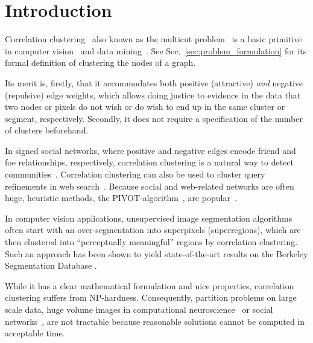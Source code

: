 %
\section{Introduction}
Correlation clustering~\cite{Bansal-2002} also known as the multicut problem~\cite{chopra_1993_mp} 
is a basic primitive in computer vision~\cite{andres_2011_iccv,kroeger_2012_eccv,yarkony_2012_eccv,alush_2013_simbad} and data mining~\cite{Chierichetti-2014,Arasu-2009,Sadikov-2010,Chen-2012}.
See Sec.~\ref{sec:problem_formulation} for its formal definition of clustering the nodes of a graph.
 
Its merit is, firstly, that it accommodates both positive (attractive) \emph{and} negative (repulsive) edge weights,
which allows doing justice to evidence in the data that two nodes or pixels do not wish or do wish to end up in the same cluster or segment, respectively.
Secondly, it does not require a specification of the number of clusters beforehand.


In signed social networks, where positive and negative edges encode friend and foe relationships, respectively,
correlation clustering is a natural way to detect communities~\cite{Chierichetti-2014,Chen-2012}.
Correlation clustering can also be used to cluster query refinements in web search~\cite{Sadikov-2010}.
Because social and web-related networks are often huge, heuristic methods, \eg the PIVOT-algorithm~\cite{Ailon-2008},
are popular~\cite{Chierichetti-2014}.

In computer vision applications, unsupervised image segmentation algorithms often start with an over-segmentation
into superpixels (superregions), which are then clustered into ``perceptually meaningful''
regions by correlation clustering.
Such an approach has been shown to yield
state-of-the-art results on the Berkeley Segmentation Database
\cite{andres_2011_iccv,Kim-2011,yarkony_2012_eccv,alush_2013_simbad}.

While it has a clear mathematical formulation and nice properties,
correlation clustering suffers from NP-hardness. 
%
Consequently, partition problems on large scale data, \eg
huge volume images in computational neuroscience~\cite{kroeger_2012_eccv}
or social networks~\cite{Leskovec-2010}, 
are not tractable because reasonable solutions cannot be computed in acceptable time.


